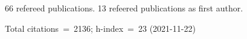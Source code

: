 66 refereed publications. 13 refeered publications as first author.

Total citations~=~2136; h-index~=~23 (2021-11-22)